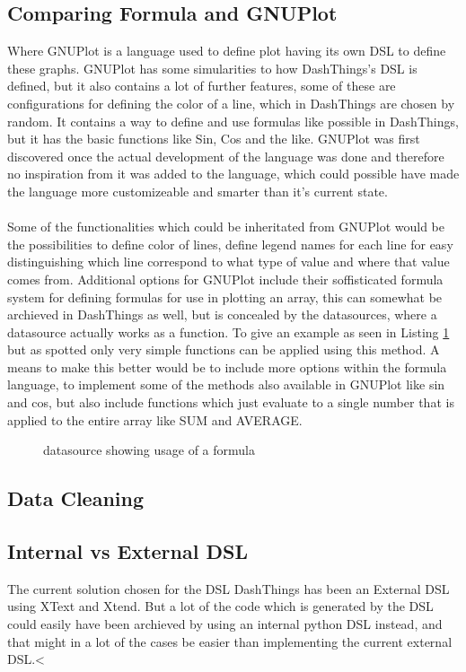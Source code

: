 \subsection{Comparing Formula and GNUPlot} 
\label{gnuplot}
Where GNUPlot is a language used to define
plot having its own DSL to define these graphs. GNUPlot has some simularities to how DashThings's
DSL is defined, but it also contains a lot of further features, some of these are configurations
for defining the color of a line, which in DashThings are chosen by random. It contains a way
to define and use formulas like possible in DashThings, but it has the basic functions like
Sin, Cos and the like. GNUPlot was first discovered once the actual development of the language
was done and therefore no inspiration from it was added to the language, which could possible have
made the language more customizeable and smarter than it's current state.
\\
\\
Some of the functionalities which could be inheritated from GNUPlot would be the possibilities to
define color of lines, define legend names for each line for easy distinguishing which line
correspond to what type of value and where that value comes from. Additional options for GNUPlot
include their soffisticated formula system for defining formulas for use in plotting an array,
this can somewhat be archieved in DashThings as well, but is concealed by the datasources, where
a datasource actually works as a function. To give an example as seen in Listing
\ref{lst:datasource-formula} but as spotted only very simple functions can be applied using
this method. A means to make this better would be to include more options within the formula
language, to implement some of the methods also available in GNUPlot like sin and cos, but also
include functions which just evaluate to a single number that is applied to the entire array
like SUM and AVERAGE.

\begin{figure}
  \caption{datasource showing usage of a formula}
  \label{lst:datasource-formula}
  
\end{figure}

\subsection{Data Cleaning}

\subsection{Internal vs External DSL} The current solution chosen for the DSL DashThings has
been an External DSL using XText and Xtend. But a lot of the code which is generated by the DSL
could easily have been archieved by using an internal python DSL instead, and that might in a lot
of the cases be easier than implementing the current external DSL.<
 